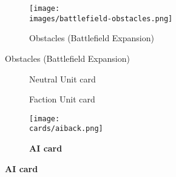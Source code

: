 \vspace*{-1.5em}
\begin{figure}[H]
  \centering
  \begin{subfigure}[b]{0.5\linewidth}
    \centering
    \texttt{[image: \\images/battlefield-obstacles.png]}
    \caption{\centering Obstacles (Battlefield Expansion)}
  \end{subfigure}
\end{figure}
\clearpage
\vspace*{-4em}
\begin{figure}[H]
  \centering
  \begin{subfigure}[b]{0.25\linewidth}
    \caption{\centering Neutral Unit card}
  \end{subfigure}
  \begin{subfigure}[b]{0.25\linewidth}
    \caption{\centering Faction Unit card}
  \end{subfigure}
  \begin{subfigure}[b]{0.25\linewidth}
    \texttt{[image: \\cards/aiback.png]}
    \caption{\textbf{AI card}}
  \end{subfigure}
\end{figure}
\vspace*{-2em}
